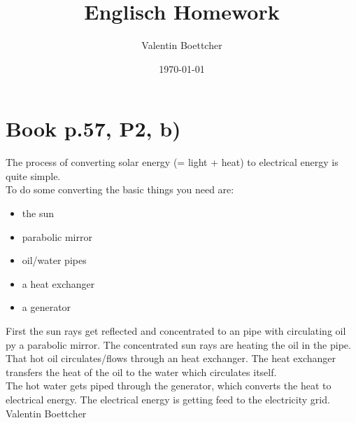 \documentclass{article}
\author{Valentin Boettcher}
\date{\today}
\title{Englisch Homework}
\begin{document}
\maketitle
\thispagestyle{empty}

\section*{Book p.57, P2, b)}
The process of converting solar energy (= light + heat) to electrical energy is quite simple.\\
To do some converting the basic things you need are:
\begin{itemize}\itemsep0pt
\item the sun
\item parabolic mirror
\item oil/water pipes
\item a heat exchanger
\item a generator
\end{itemize}
First the sun rays get reflected and concentrated to an pipe with circulating oil py a parabolic mirror. The concentrated sun rays are heating the oil in the pipe. That hot oil circulates/flows through an heat exchanger. The heat exchanger transfers the heat of the oil  to the water which circulates itself.\\
The hot water gets piped through the generator, which converts the heat to electrical energy. 
The electrical energy is getting feed to the electricity grid.\\


Valentin Boettcher
\end{document}
